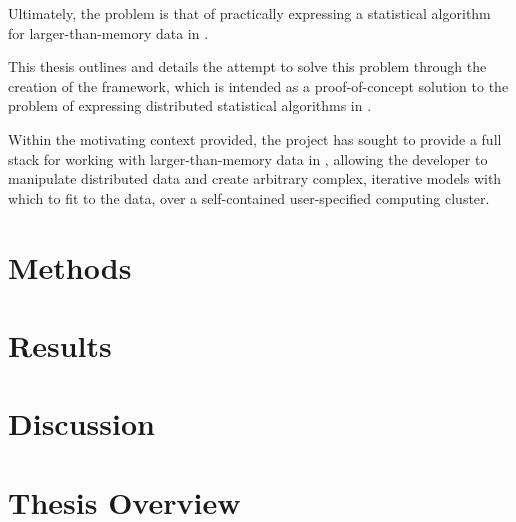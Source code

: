 Ultimately, the problem is that of practically expressing a statistical algorithm for larger-than-memory data in \R{}.

This thesis outlines and details the attempt to solve this problem through the creation of the \lsr{} framework, which is intended as a proof-of-concept solution to the problem of expressing distributed statistical algorithms in \R{}.

Within the motivating context provided, the \lsr{} project has sought to provide a full stack for working with larger-than-memory data in \R{}, allowing the developer to manipulate distributed data and create arbitrary complex, iterative models with which to fit to the data, over a self-contained user-specified computing cluster.

\section{Methods}\label{sec:methods}

\section{Results}\label{sec:results}

\section{Discussion}\label{sec:discussion}

\section{Thesis Overview}\label{sec:intro-overview}


